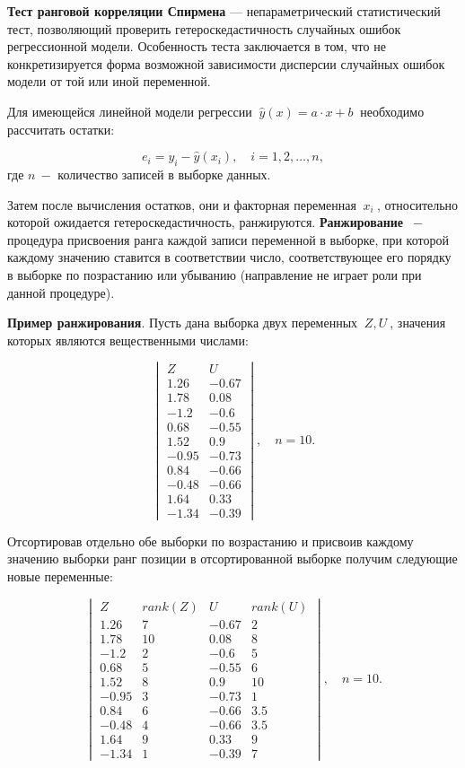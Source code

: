 \documentclass[
]{article}
\begin{document}
\textbf{Тест ранговой корреляции Спирмена} --- непараметрический
статистический тест, позволяющий проверить гетероскедастичность
случайных ошибок регрессионной модели. Особенность теста заключается в
том, что не конкретизируется форма возможной зависимости дисперсии
случайных ошибок модели от той или иной переменной.

Для имеющейся линейной модели регрессии
\(\ \hat{y}(x) = a \cdot x + b\ \) необходимо рассчитать остатки:

\[
e_i = y_i - \hat{y}(x_i), \quad i = 1, 2, \dots, n,
\] где \(n\ -\) количество записей в выборке данных.

Затем после вычисления остатков, они и факторная переменная \(\ x_i\ \),
относительно которой ожидается гетероскедастичность, ранжируются.
\textbf{Ранжирование} \(\ -\ \) процедура присвоения ранга каждой записи
переменной в выборке, при которой каждому значению ставится в
соответствии число, соответствующее его порядку в выборке по позрастанию
или убыванию (направление не играет роли при данной процедуре).

\textbf{Пример ранжирования}. Пусть дана выборка двух переменных
\(\ Z, U\ \), значения которых являются вещественными числами:

\[
\begin{vmatrix} 
Z & U \\
1.26 & -0.67 \\
1.78 & 0.08 \\
-1.2 & -0.6 \\
0.68 & -0.55 \\
1.52 & 0.9 \\
-0.95 & -0.73 \\
0.84 & -0.66 \\
-0.48 & -0.66 \\
1.64 & 0.33\\
-1.34 & -0.39
\end{vmatrix}, \quad n = 10.
\]

Отсортировав отдельно обе выборки по возрастанию и присвоив каждому
значению выборки ранг позиции в отсортированной выборке получим
следующие новые переменные:

\[
\begin{vmatrix} 
Z & rank(Z) & U & rank(U) \\
1.26 & 7 & -0.67 & 2 \\
1.78 & 10 & 0.08 & 8 \\
-1.2 & 2 & -0.6 & 5 \\
0.68 & 5 & -0.55 & 6 \\
1.52 & 8 & 0.9 & 10 \\
-0.95 & 3 & -0.73 & 1 \\
0.84 & 6 & -0.66 & 3.5 \\
-0.48 & 4 & -0.66 & 3.5 \\
1.64 & 9 & 0.33 & 9\\
-1.34 & 1 & -0.39 & 7
\end{vmatrix}, \quad n = 10.
\]
\end{document}
